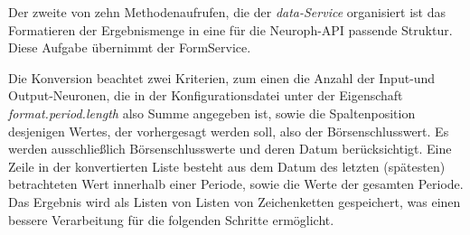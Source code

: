 Der zweite von zehn Methodenaufrufen, die der \emph{data-Service} organisiert ist das Formatieren der Ergebnismenge in eine für die Neuroph-API passende Struktur. Diese Aufgabe übernimmt der FormService.


%

Die Konversion beachtet zwei Kriterien, zum einen die Anzahl der Input-und Output-Neuronen, die in der Konfigurationsdatei unter der Eigenschaft \emph{format.period.length} also Summe angegeben ist, sowie die Spaltenposition desjenigen Wertes, der vorhergesagt werden soll, also der Börsenschlusswert.
Es werden ausschließlich Börsenschlusswerte und deren Datum berücksichtigt. Eine Zeile in der konvertierten Liste besteht aus dem Datum des letzten (spätesten) betrachteten Wert innerhalb einer Periode, sowie die Werte der gesamten Periode. Das Ergebnis wird als Listen von Listen von Zeichenketten gespeichert, was einen bessere Verarbeitung für die folgenden Schritte ermöglicht.\\\\

